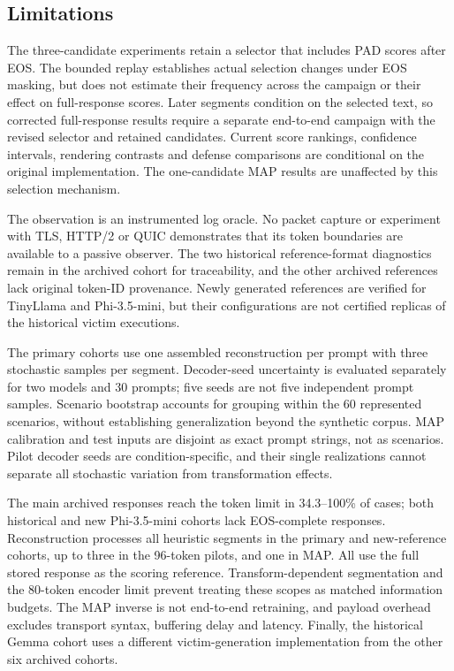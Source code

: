 \documentclass[electronics,article,submit,pdftex,moreauthors]{Definitions/mdpi}
\begin{document}
\subsection{Limitations}
The three-candidate experiments retain a selector that includes PAD scores after EOS. The bounded replay establishes actual selection changes under EOS masking, but does not estimate their frequency across the campaign or their effect on full-response scores. Later segments condition on the selected text, so corrected full-response results require a separate end-to-end campaign with the revised selector and retained candidates. Current score rankings, confidence intervals, rendering contrasts and defense comparisons are conditional on the original implementation. The one-candidate MAP results are unaffected by this selection mechanism.

The observation is an instrumented log oracle. No packet capture or experiment with TLS, HTTP/2 or QUIC demonstrates that its token boundaries are available to a passive observer. The two historical reference-format diagnostics remain in the archived cohort for traceability, and the other archived references lack original token-ID provenance. Newly generated references are verified for TinyLlama and Phi-3.5-mini, but their configurations are not certified replicas of the historical victim executions.

The primary cohorts use one assembled reconstruction per prompt with three stochastic samples per segment. Decoder-seed uncertainty is evaluated separately for two models and 30 prompts; five seeds are not five independent prompt samples. Scenario bootstrap accounts for grouping within the 60 represented scenarios, without establishing generalization beyond the synthetic corpus. MAP calibration and test inputs are disjoint as exact prompt strings, not as scenarios. Pilot decoder seeds are condition-specific, and their single realizations cannot separate all stochastic variation from transformation effects.

The main archived responses reach the token limit in 34.3--100\% of cases; both historical and new Phi-3.5-mini cohorts lack EOS-complete responses. Reconstruction processes all heuristic segments in the primary and new-reference cohorts, up to three in the 96-token pilots, and one in MAP. All use the full stored response as the scoring reference. Transform-dependent segmentation and the 80-token encoder limit prevent treating these scopes as matched information budgets. The MAP inverse is not end-to-end retraining, and payload overhead excludes transport syntax, buffering delay and latency. Finally, the historical Gemma cohort uses a different victim-generation implementation from the other six archived cohorts.
\end{document}
